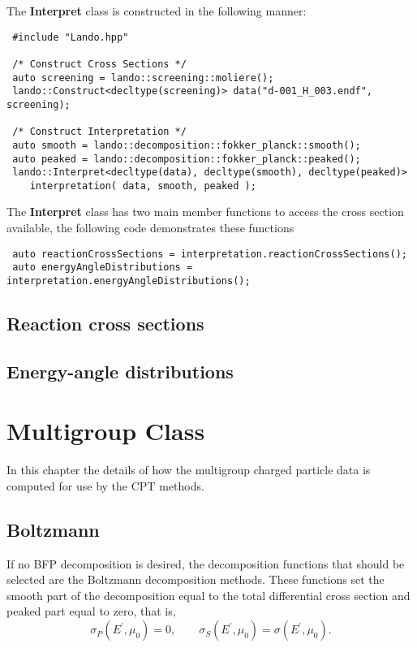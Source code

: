 \documentclass[../main.tex]{subfiles}
\begin{document}
The \textbf{Interpret} class is constructed in the following manner:
\begin{verbatim}
 #include "Lando.hpp"

 /* Construct Cross Sections */
 auto screening = lando::screening::moliere();
 lando::Construct<decltype(screening)> data("d-001_H_003.endf", screening);

 /* Construct Interpretation */
 auto smooth = lando::decomposition::fokker_planck::smooth();
 auto peaked = lando::decomposition::fokker_planck::peaked();
 lando::Interpret<decltype(data), decltype(smooth), decltype(peaked)> 
    interpretation( data, smooth, peaked );
\end{verbatim}
The \textbf{Interpret} class has two main member functions to access the cross section available, the following code demonstrates these functions
\begin{verbatim}
 auto reactionCrossSections = interpretation.reactionCrossSections();
 auto energyAngleDistributions = interpretation.energyAngleDistributions();
\end{verbatim}

\subsection{Reaction cross sections}

\subsection{Energy-angle distributions}

\section{Multigroup Class}
In this chapter the details of how the multigroup charged particle data is computed for use by the CPT methods.



\subsection{Boltzmann}
If no BFP decomposition is desired, the decomposition functions that should be selected are the Boltzmann decomposition methods. These functions set the smooth part of the decomposition equal to the total differential cross section and peaked part equal to zero, that is,
\begin{equation}
    \sigma_P(E^{\prime},\mu_0) = 0, \quad \quad \sigma_S(E^{\prime},\mu_0) = \sigma(E^{\prime},\mu_0).
\end{equation}
\end{document}
